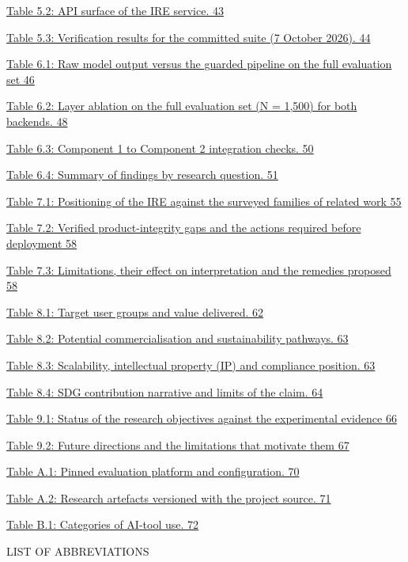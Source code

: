 \documentclass[
]{article}
\begin{document}
\protect\hyperlink{_Toc900108}{Table 5.2: API surface of the IRE
service. 43}

\protect\hyperlink{_Toc900112}{Table 5.3: Verification results for the
committed suite (7 October 2026). 44}

\protect\hyperlink{_Toc900118}{Table 6.1: Raw model output versus the
guarded pipeline on the full evaluation set 46}

\protect\hyperlink{_Toc900122}{Table 6.2: Layer ablation on the full
evaluation set (N = 1,500) for both backends. 48}

\protect\hyperlink{_Toc900131}{Table 6.3: Component 1 to Component 2
integration checks. 50}

\protect\hyperlink{_Toc900133}{Table 6.4: Summary of findings by
research question. 51}

\protect\hyperlink{_Toc900140}{Table 7.1: Positioning of the IRE against
the surveyed families of related work 55}

\protect\hyperlink{_Toc900143}{Table 7.2: Verified product-integrity
gaps and the actions required before deployment 58}

\protect\hyperlink{_Toc900145}{Table 7.3: Limitations, their effect on
interpretation and the remedies proposed 58}

\protect\hyperlink{_Toc900151}{Table 8.1: Target user groups and value
delivered. 62}

\protect\hyperlink{_Toc900154}{Table 8.2: Potential commercialisation
and sustainability pathways. 63}

\protect\hyperlink{_Toc900156}{Table 8.3: Scalability, intellectual
property (IP) and compliance position. 63}

\protect\hyperlink{_Toc900158}{Table 8.4: SDG contribution narrative and
limits of the claim. 64}

\protect\hyperlink{_Toc900162}{Table 9.1: Status of the research
objectives against the experimental evidence 66}

\protect\hyperlink{_Toc900167}{Table 9.2: Future directions and the
limitations that motivate them 67}

\protect\hyperlink{_Toc900171}{Table A.1: Pinned evaluation platform and
configuration. 70}

\protect\hyperlink{_Toc900173}{Table A.2: Research artefacts versioned
with the project source. 71}

\protect\hyperlink{_Toc900178}{Table B.1: Categories of AI-tool use. 72}

\protect\hypertarget{_Toc900005}{}{}LIST OF ABBREVIATIONS
\end{document}
